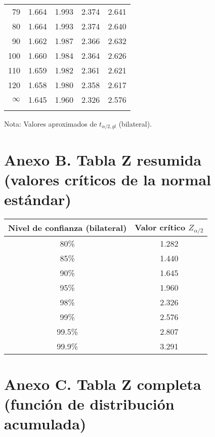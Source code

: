 {\begin{minipage}[t]{0.485\linewidth}
\begin{tabular}{r|cccc}
79  & 1.664  & 1.993  & 2.374  & 2.641 \\
80  & 1.664  & 1.993  & 2.374  & 2.640 \\
90  & 1.662  & 1.987  & 2.366  & 2.632 \\
100 & 1.660  & 1.984  & 2.364  & 2.626 \\
110 & 1.659  & 1.982  & 2.361  & 2.621 \\
120 & 1.658  & 1.980  & 2.358  & 2.617 \\
$\infty$ & 1.645 & 1.960 & 2.326 & 2.576 \\
\phantom{43} & \phantom{1.681} & \phantom{2.017} & \phantom{2.416} & \phantom{2.695} \\
\bottomrule
\end{tabular}
\end{minipage}
}%

\medskip
\noindent\footnotesize Nota: Valores aproximados de $t_{\alpha/2,gl}$ (bilateral).
\normalsize







\section*{Anexo B. Tabla Z resumida (valores críticos de la normal estándar)}

\begin{center}
\renewcommand{\arraystretch}{1.2}
\begin{tabular}{c|c}
\toprule
\textbf{Nivel de confianza (bilateral)} & \textbf{Valor crítico $Z_{\alpha/2}$} \\
\midrule
80\% & 1.282 \\
85\% & 1.440 \\
90\% & 1.645 \\
95\% & 1.960 \\
98\% & 2.326 \\
99\% & 2.576 \\
99.5\% & 2.807 \\
99.9\% & 3.291 \\
\bottomrule
\end{tabular}
\end{center}


\section*{Anexo C. Tabla Z completa (función de distribución acumulada)}


